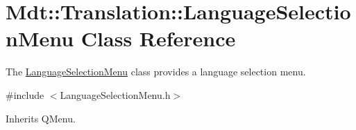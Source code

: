 \hypertarget{class_mdt_1_1_translation_1_1_language_selection_menu}{}\section{Mdt\+:\+:Translation\+:\+:Language\+Selection\+Menu Class Reference}
\label{class_mdt_1_1_translation_1_1_language_selection_menu}


The \hyperlink{class_mdt_1_1_translation_1_1_language_selection_menu}{Language\+Selection\+Menu} class provides a language selection menu.  




{\ttfamily \#include $<$Language\+Selection\+Menu.\+h$>$}



Inherits Q\+Menu.

